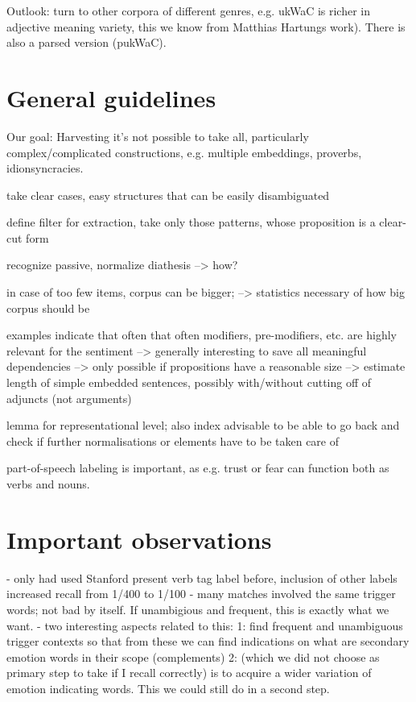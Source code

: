 Outlook: turn to other corpora of different genres, e.g. ukWaC is richer in adjective meaning variety, this we know from Matthias Hartungs work). There is also a parsed version (pukWaC).

\section{General guidelines}

Our goal: Harvesting
it's not possible to take all, particularly complex/complicated constructions, e.g. multiple embeddings, proverbs, idionsyncracies.

take clear cases, easy structures that can be easily disambiguated

define filter for extraction, take only those patterns, whose proposition is a clear-cut form

recognize passive, normalize diathesis --> how?

in case of too few items, corpus can be bigger; 
--> statistics necessary of how big corpus should be

examples indicate that often that often modifiers, pre-modifiers, etc. are highly relevant for the sentiment
--> generally interesting to save all meaningful dependencies
--> only possible if propositions have a reasonable size
--> estimate length of simple embedded sentences, possibly with/without cutting off of adjuncts (not arguments)

lemma for representational level; also index advisable to be able to go back and check if further normalisations or elements have to be taken care of

part-of-speech labeling is important, as e.g. trust or fear can function both as verbs and nouns.


\section{Important observations}

- only had used Stanford present verb tag label before, inclusion of other labels increased recall from 1/400 to 1/100
- many matches involved the same trigger words; not bad by itself. If unambigious and frequent, this is exactly what we want.
- two interesting aspects related to this:
1: find frequent and unambiguous trigger contexts so that from these we can find indications on what are secondary emotion words in their scope (complements)
2: (which we did not choose as primary step to take if I recall correctly) is to acquire a wider variation of emotion indicating words. This we could still do in a second step.


